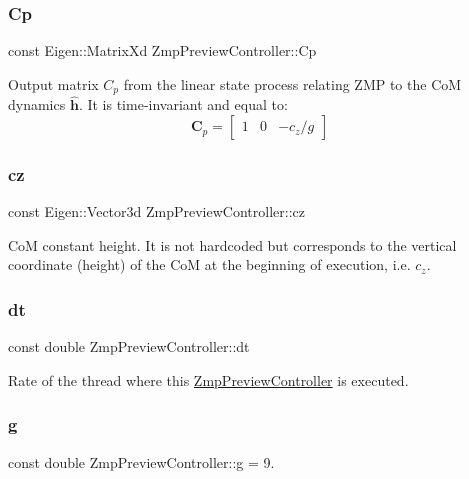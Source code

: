 \subsubsection{\texorpdfstring{Cp}{Cp}}
{\footnotesize\ttfamily const Eigen\+::\+Matrix\+Xd Zmp\+Preview\+Controller\+::\+Cp\hspace{0.3cm}{\ttfamily [private]}}

Output matrix $C_p$ from the linear state process relating Z\+MP to the CoM dynamics $\hat{\mathbf{h}}$. It is time-\/invariant and equal to\+: \[ \mathbf{C}_p = \left[\begin{array}{ccc} 1 & 0 & -c_z/g \end{array}\right] \] \hypertarget{classZmpPreviewController_a893b789fddc949d0703461963280f504}{}\label{classZmpPreviewController_a893b789fddc949d0703461963280f504} 
\subsubsection{\texorpdfstring{cz}{cz}}
{\footnotesize\ttfamily const Eigen\+::\+Vector3d Zmp\+Preview\+Controller\+::cz\hspace{0.3cm}{\ttfamily [private]}}

CoM constant height. It is not hardcoded but corresponds to the vertical coordinate (height) of the CoM at the beginning of execution, i.\+e. $ c_z $. \hypertarget{classZmpPreviewController_abf1a3ec8d1698afab1c20bba32b5a724}{}\label{classZmpPreviewController_abf1a3ec8d1698afab1c20bba32b5a724} 
\subsubsection{\texorpdfstring{dt}{dt}}
{\footnotesize\ttfamily const double Zmp\+Preview\+Controller\+::dt\hspace{0.3cm}{\ttfamily [private]}}

Rate of the thread where this \hyperlink{classZmpPreviewController}{Zmp\+Preview\+Controller} is executed. \hypertarget{classZmpPreviewController_a344571f012aa58250d7625905681bf1b}{}\label{classZmpPreviewController_a344571f012aa58250d7625905681bf1b} 
\subsubsection{\texorpdfstring{g}{g}}
{\footnotesize\ttfamily const double Zmp\+Preview\+Controller\+::g = 9.\hspace{0.3cm}{\ttfamily [private]}}

